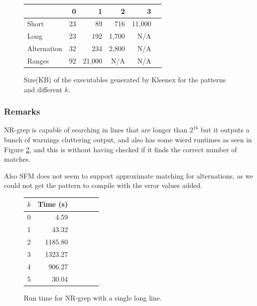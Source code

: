 \begin{figure}[!ht]
    \centering
    \begin{tabular}{l|rrrrr}
                    & 0     & 1     & 2     & 3\\\hline
        Short       & 23    & 89    & 716   & 11,000\\
        Long        & 23    & 192   & 1,700 & N/A\\
        Alternation & 32    & 234   & 2,800 & N/A\\
        Ranges      & 92    & 21,000& N/A   & N/A\\
    \end{tabular}
    \caption{Size(KB) of the executables generated by Kleenex for the patterns
    and different $k$.}
    \label{fig:exec}
\end{figure}

\subsubsection{Remarks}
NR-grep is capable of searching in lines that are longer than $2^{16}$ but it
outputs a bunch of warnings cluttering output, and also has some wierd runtimes
as seen in Figure \ref{fig:nr-longline}, and this is without having checked if
it finds the correct number of matches.

Also SFM does not seem to support approximate matching for alternations, as we
could not get the pattern to compile with the error values added.

\begin{figure}[!ht]
    \centering
    \begin{tabular}{l|rrrrr}
        $k$ & Time (s)\\\hline
        0   & 4.59\\
        1   & 43.32\\
        2   & 1185.80\\
        3   & 1323.27\\
        4   & 906.27\\
        5   & 30.04\\
    \end{tabular}
    \caption{Run time for NR-grep with a single long line.}
    \label{fig:nr-longline}
\end{figure}


